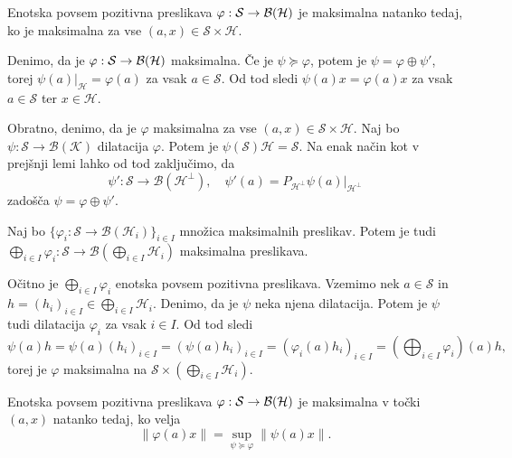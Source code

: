 \begin{lema}
    Enotska povsem pozitivna preslikava $\varphi: \mathcal{S} \to \operatorname{\mathcal{B} (\mathcal{H})}$ je maksimalna natanko tedaj, ko je maksimalna za vse $(a, x) \in \mathcal{S} \times \mathcal{H}$.
\end{lema}

\begin{dokaz}
    Denimo, da je $\varphi: \mathcal{S} \to \operatorname{\mathcal{B} (\mathcal{H})}$ maksimalna.
    Če je $\psi \succeq \varphi$, potem je $\psi = \varphi \oplus \psi'$,
    torej $\psi (a) |_{\mathcal{H}} = \varphi(a)$ za vsak $a \in \mathcal{S}$.
    Od tod sledi $\psi (a) x = \varphi(a) x$ za vsak $a \in \mathcal{S}$ ter $x \in \mathcal{H}$.

    Obratno, denimo, da je $\varphi$ maksimalna za vse $(a, x) \in \mathcal{S} \times \mathcal{H}$.
    Naj bo $\psi: \mathcal{S} \to \mathcal{B}(\mathcal{K})$ dilatacija $\varphi$. 
    Potem je $\psi (\mathcal{S}) \mathcal{H} = \mathcal{S}$. Na enak način kot v prejšnji lemi lahko od tod zaključimo,
    da $$\psi': \mathcal{S} \to \mathcal{B}(\mathcal{H}^\perp),\quad \psi' (a) = P_{\mathcal{H}^\perp} \psi (a) |_{\mathcal{H}^\perp}$$
    zadošča $\psi = \varphi \oplus \psi'$.
\end{dokaz}

\begin{posledica}
    Naj bo $\{\varphi_i: \mathcal{S} \to \mathcal{B}(\mathcal{H}_i)\}_{i \in I}$ množica maksimalnih preslikav.
    Potem je tudi $\bigoplus_{i \in I} \varphi_i : \mathcal{S} \to \mathcal{B}\left(\bigoplus_{i \in I} \mathcal{H}_i\right)$
    maksimalna preslikava.
\end{posledica}

\begin{dokaz}
    Očitno je $\bigoplus_{i \in I} \varphi_i$ enotska povsem pozitivna preslikava.
    Vzemimo nek $a \in \mathcal{S}$ in $h = (h_i)_{i \in I} \in \bigoplus_{i \in I} \mathcal{H}_i$.
    Denimo, da je $\psi$ neka njena dilatacija. Potem je $\psi$ tudi dilatacija $\varphi_i$ za vsak $i \in I$.
    Od tod sledi $$\psi (a) h = \psi (a) (h_i)_{i \in I} = (\psi(a) h_i)_{i \in I} = (\varphi_i (a) h_i)_{i \in I} = \left(\bigoplus_{i \in I} \varphi_i \right) (a) h,$$
    torej je $\varphi$ maksimalna na $\mathcal{S} \times \left(\bigoplus_{i \in I} \mathcal{H}_i \right)$.
\end{dokaz}

\begin{lema}
    Enotska povsem pozitivna preslikava $\varphi: \mathcal{S} \to \operatorname{\mathcal{B} (\mathcal{H})}$ je maksimalna v točki $(a, x)$ natanko tedaj, ko velja 
    $$\| \varphi (a) x \| = \sup_{\psi \succeq \varphi} \| \psi(a) x \|.$$
\end{lema}

